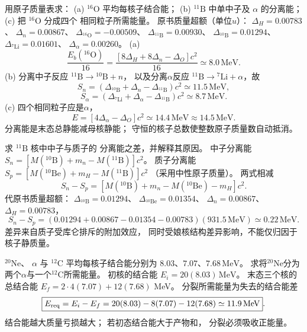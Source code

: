 用原子质量表求：
(a) $\mathrm{^{16}O}$ 平均每核子结合能；
(b) $\mathrm{^{11}B}$ 中单中子及 $\alpha$
的分离能；(c) 把 $\mathrm{^{16}O}$ 分成四个
相同粒子所需能量。
\exsolution
原书质量超额（单位$u$）：
$\Delta_H=0.00783$、
$\Delta_n=0.00867$、
$\Delta_{\mathrm{^{16}O}}=-0.00509$、
$\Delta_{\mathrm{^{11}B}}=0.00930$、
$\Delta_{\mathrm{^{10}B}}=0.01294$、
$\Delta_{\mathrm{^{7}Li}}=0.01601$、
$\Delta_\alpha=0.00260$。
(a)
\[
 \boxed{\frac{E_b(\mathrm{^{16}O})}{16}
 =\frac{[8\Delta_H+8\Delta_n-\Delta_O]c^2}{16}
 \simeq8.0\,\mathrm{MeV}}.
\]
(b) 分离中子反应
$\mathrm{^{11}B}\to\mathrm{^{10}B}+n$，
以及分离$\alpha$反应
$\mathrm{^{11}B}\to\mathrm{^{7}Li}+\alpha$，故
\[
 \boxed{S_n=(\Delta_{\mathrm{^{10}B}}
 +\Delta_n-\Delta_{\mathrm{^{11}B}})c^2
 \simeq11.5\,\mathrm{MeV}},
\]
\[
 \boxed{S_\alpha=(\Delta_{\mathrm{^{7}Li}}
 +\Delta_\alpha-\Delta_{\mathrm{^{11}B}})c^2
 \simeq8.7\,\mathrm{MeV}}.
\]
(c) 四个相同粒子应是$\alpha$，
\[
 \boxed{E= [4\Delta_\alpha-\Delta_O]c^2
 \simeq14.4\,\mathrm{MeV}\approx14.5\,\mathrm{MeV}}.
\]
\excheck 分离能是末态总静能减母核静能；
守恒的核子总数使整数原子质量数自动抵消。

求 $\mathrm{^{11}B}$ 核中中子与质子的
分离能之差，并解释其原因。
\exsolution
中子分离能
$S_n=[M(\mathrm{^{10}B})+m_n-M(\mathrm{^{11}B})]c^2$。
质子分离能
$S_p=[M(\mathrm{^{10}Be})+m_H-M(\mathrm{^{11}B})]c^2$
（采用中性原子质量）。
两式相减
\[
 S_n-S_p=
 [M(\mathrm{^{10}B})+m_n
 -M(\mathrm{^{10}Be})-m_H]c^2.
\]
代原书质量超额：
$\Delta_{\mathrm{^{10}B}}=0.01294$、
$\Delta_{\mathrm{^{10}Be}}=0.01354$、
$\Delta_n=0.00867$、
$\Delta_H=0.00783$，
\[
 \boxed{S_n-S_p=
 (0.01294+0.00867-0.01354-0.00783)
 (931.5\,\mathrm{MeV})
 \simeq0.22\,\mathrm{MeV}}.
\]
\excheck 差异来自质子受库仑排斥的附加效应，
同时受娘核结构差异影响，不能仅归因于核子静质量。

$\mathrm{^{20}Ne}$、
$\alpha$ 与 $\mathrm{^{12}C}$
平均每核子结合能分别为
$8.03$、$7.07$、$7.68\,\mathrm{MeV}$。
求将$\mathrm{^{20}Ne}$分为
两个$\alpha$与一个$\mathrm{^{12}C}$所需能量。
\exsolution
初核的结合能
$E_i=20(8.03)\,\mathrm{MeV}$。
末态三个核的总结合能
$E_f=2\cdot4(7.07)+12(7.68)$ MeV。
分裂所需能量为失去的结合能差
\[
 \boxed{E_{\rm req}=E_i-E_f
 =20(8.03)-8(7.07)-12(7.68)
 \simeq11.9\,\mathrm{MeV}}.
\]
\excheck 结合能越大质量亏损越大；
若初态结合能大于产物和，
分裂必须吸收正能量。
